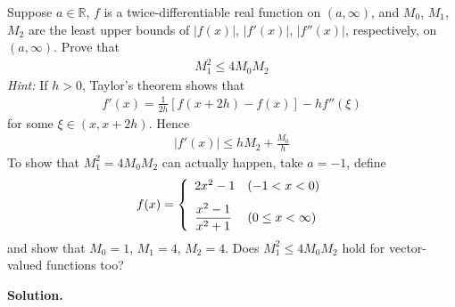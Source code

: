 \documentclass[12pt]{article}
\theoremstyle{definition}
\begin{document}
Suppose $a\in \mathbb{R}$, $f$ is a twice-differentiable real function on $(a,\infty)$, and $M_0$, $M_1$, $M_2$ are the least upper bounds of $\left\vert f(x)\right\vert$, $\left\vert f'(x)\right\vert$, $\left\vert f''(x)\right\vert$, respectively, on $(a,\infty)$. Prove that
\begin{align*}
M_1^2\le 4M_0M_2
\end{align*}
\textit{Hint:} If $h>0$, Taylor's theorem shows that
\begin{align*}
f'(x)=\frac{1}{2h}\left[f(x+2h)-f(x)\right]-hf''(\xi)
\end{align*}
for some $\xi\in(x,x+2h)$. Hence
\begin{align*}
\left\vert f'(x)\right\vert\le hM_2+\frac{M_0}{h}
\end{align*}
To show that $M_1^2=4M_0M_2$ can actually happen, take $a=-1$, define
\begin{align*}
f(x)=\left\{\begin{array}{ll}
2x^2-1&\mbox{($-1<x<0$)}\vspace{0.1in}\\
\dfrac{x^2-1}{x^2+1}&\mbox{($0\le x<\infty$)}
\end{array}\right.
\end{align*}
and show that $M_0=1$, $M_1=4$, $M_2=4$.
Does $M_1^2\le 4M_0M_2$ hold for vector-valued functions too?

\smallskip
\noindent\textbf{Solution.}\quad
\end{document}
